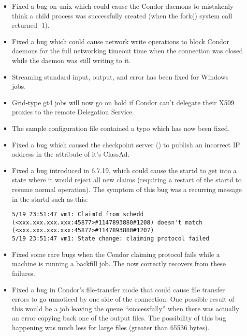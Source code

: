 \begin{itemize}
\item Fixed a bug on unix which could cause the Condor daemons to mistakenly
think a child process was successfully created (when the fork() system
call returned -1).

\item Fixed a bug which could cause network write operations to block
Condor daemons for the full networking timeout time when the connection
was closed while the daemon was still writing to it.

\item Streaming standard input, output, and error has been fixed for
Windows jobs.

\item Grid-type gt4 jobs will now go on hold if Condor can't delegate
their X509 proxies to the remote Delegation Service.

\item The sample configuration file 
contained a typo which has now been fixed.

\item Fixed a bug which caused the checkpoint server
() to publish an incorrect IP address in the
 attribute of it's ClassAd.

\item Fixed a bug introduced in 6.7.19, which could cause the startd
to get into a state where it would reject all new claims (requiring a
restart of the startd to resume normal operation).  The symptom of
this bug was a recurring message in the startd such as this:

\begin{verbatim}
5/19 23:51:47 vm1: ClaimId from schedd (<xxx.xxx.xxx.xxx:45877>#1147893880#1208) doesn't match (<xxx.xxx.xxx.xxx:45877>#1147893880#1207)
5/19 23:51:47 vm1: State change: claiming protocol failed
\end{verbatim}

\item Fixed some rare bugs when the Condor claiming protocol fails
  while a machine is running a backfill job.
  The  now correctly recovers from these failures.

\item Fixed a bug in Condor's file-transfer mode that could cause file
transfer errors to go unnoticed by one side of the connection.  One
possible result of this would be a job leaving the queue
``successfully'' when there was actually an error copying back one of
the output files.  The possibility of this bug happening was much less
for large files (greater than 65536 bytes).


\end{itemize}
